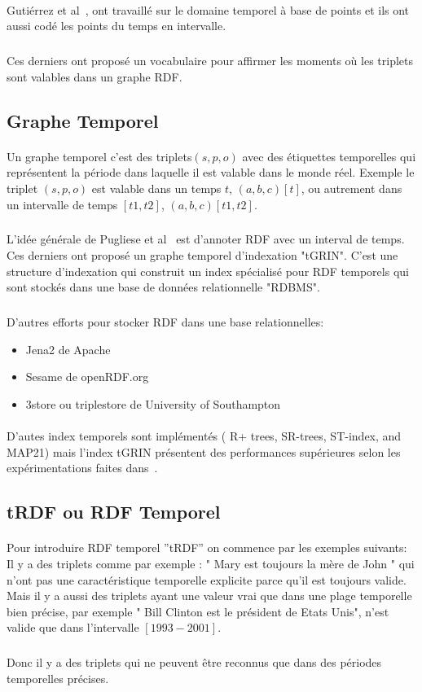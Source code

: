 \paragraph{}
Gutiérrez et al~\cite{gutierrez2007}, ont travaillé sur le domaine temporel à base de points et ils ont aussi codé les points du temps en intervalle.
\subparagraph{}
Ces derniers ont proposé un vocabulaire pour affirmer les moments où les triplets sont valables dans un graphe RDF.
\subsection*{Graphe Temporel}
\paragraph{}
Un graphe temporel c'est des triplets$(s,p,o)$ avec des étiquettes temporelles qui représentent la période dans laquelle il est valable dans le monde réel.
Exemple le triplet $(s,p,o)$ est valable dans un temps $t$, $(a,b,c)[t]$, ou autrement dans un intervalle de temps $[t1,t2]$, $(a,b,c)[t1,t2]$.
\subparagraph{}
L'idée générale de Pugliese et al~\cite{pugliese2008} est d'annoter RDF avec un interval de temps.
Ces derniers ont proposé un graphe temporel d'indexation "tGRIN". C'est une structure d’indexation qui construit un index spécialisé pour RDF temporels qui sont stockés dans une base de données relationnelle "RDBMS".
\subparagraph{}
D’autres efforts pour stocker RDF dans une base relationnelles:
\begin{itemize}
\item Jena2 de Apache
\item Sesame de openRDF.org
\item 3store ou triplestore de University of Southampton
\end{itemize}
\paragraph{}
D'autes index temporels sont implémentés ( R+ trees, SR-trees, ST-index, and MAP21) mais l'index tGRIN présentent des performances supérieures selon les expérimentations faites dans~\cite{pugliese2008}.
\subsection*{tRDF ou RDF Temporel}
\paragraph{}
Pour introduire RDF temporel ''tRDF'' on commence par les exemples suivants:
\newline
Il y a des triplets comme par exemple : " Mary est toujours la mère de John " qui n'ont pas une caractéristique temporelle explicite parce qu'il est toujours valide.
Mais il y a aussi des triplets ayant une valeur vrai que dans une plage temporelle bien précise, par exemple
" Bill Clinton est le président de Etats Unis", n'est valide que dans l'intervalle $[1993-2001]$.   
\subparagraph{}
Donc il y a des triplets qui ne peuvent être reconnus que dans des périodes temporelles précises.
